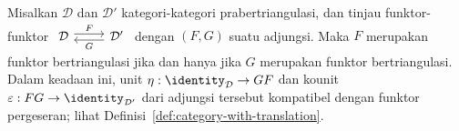 \begin{proposisi}\label{prop:adjoint-triangulated}
	Misalkan $\mathcal{D}$ dan $\mathcal{D}'$ kategori-kategori
	prabertriangulasi, dan tinjau funktor-funktor
	$\begin{tikzcd}
		\mathcal{D} \arrow[shift left, r, "F"] & \mathcal{D}' \arrow[shift left, l, "G"]
	\end{tikzcd}$
	dengan $(F, G)$ suatu adjungsi. Maka $F$ merupakan funktor
	bertriangulasi jika dan hanya jika $G$ merupakan funktor bertriangulasi.
	Dalam keadaan ini, unit $\eta: \identity_{\mathcal{D}} \to GF$ dan kounit
	$\varepsilon: FG \to \identity_{\mathcal{D}'}$ dari adjungsi tersebut
	kompatibel dengan funktor pergeseran; lihat
	Definisi~\ref{def:category-with-translation}.
\end{proposisi}

